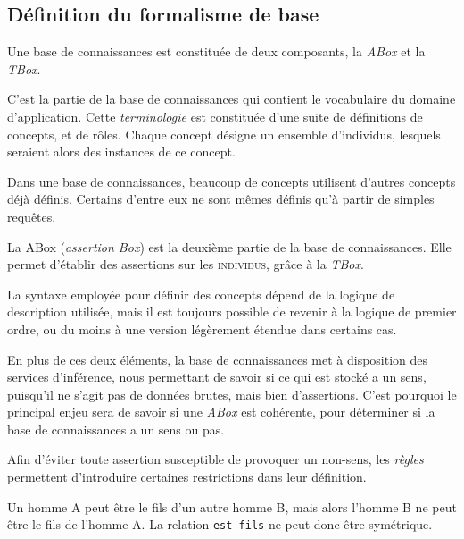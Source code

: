 

\subsection{Définition du formalisme de base}
\label{sec:defin-du-form}

\par Une base de connaissances est constituée de deux composants, la \emph{ABox} et la \emph{TBox}.

{C'est la partie de la base de connaissances qui contient le vocabulaire du domaine d'application. Cette \emph{terminologie} est constituée d'une suite de définitions de concepts, et de rôles. Chaque concept désigne un ensemble d'individus, lesquels seraient alors des instances de ce concept.}

\par Dans une base de connaissances, beaucoup de concepts utilisent d'autres concepts déjà définis. Certains d'entre eux ne sont mêmes définis qu'à partir de simples requêtes.

{La ABox (\emph{assertion Box}) est la deuxième partie de la base de connaissances. Elle permet d'établir des assertions sur les \textsc{individus}, grâce à la \emph{TBox}.}

\par La syntaxe employée pour définir des concepts dépend de la logique de description utilisée, mais il est toujours possible de revenir à la logique de premier ordre, ou du moins à une version légèrement étendue dans certains cas.

\par En plus de ces deux éléments, la base de connaissances met à disposition des services d'inférence, nous permettant de savoir si ce qui est stocké a un sens, puisqu'il ne s'agit pas de données brutes, mais bien d'assertions. C'est pourquoi le principal enjeu sera de savoir si une \emph{ABox} est cohérente, pour déterminer si la base de connaissances a un sens ou pas.

\par Afin d'éviter toute assertion susceptible de provoquer un non-sens, les \emph{règles} permettent d'introduire certaines restrictions dans leur définition.

\begin{exemple}
  Un homme A peut être le fils d'un autre homme B, mais alors l'homme B ne peut
  être le fils de l'homme A. La relation \texttt{est-fils} ne peut donc être
  symétrique.
\end{exemple}

